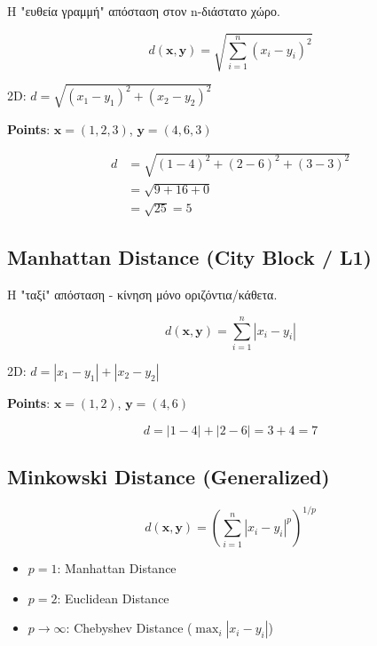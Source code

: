 Η "ευθεία γραμμή" απόσταση στον n-διάστατο χώρο.

\begin{formulabox}
\begin{equation}
d(\mathbf{x}, \mathbf{y}) = \sqrt{\sum_{i=1}^{n} (x_i - y_i)^2}
\end{equation}

2D: $d = \sqrt{(x_1 - y_1)^2 + (x_2 - y_2)^2}$
\end{formulabox}

\begin{examplebox}
\textbf{Points}: $\mathbf{x} = (1, 2, 3)$, $\mathbf{y} = (4, 6, 3)$

\begin{align*}
d &= \sqrt{(1-4)^2 + (2-6)^2 + (3-3)^2} \\
  &= \sqrt{9 + 16 + 0} \\
  &= \sqrt{25} = \boxed{5}
\end{align*}
\end{examplebox}

\subsection{Manhattan Distance (City Block / L1)}

Η "ταξί" απόσταση - κίνηση μόνο οριζόντια/κάθετα.

\begin{formulabox}
\begin{equation}
d(\mathbf{x}, \mathbf{y}) = \sum_{i=1}^{n} |x_i - y_i|
\end{equation}

2D: $d = |x_1 - y_1| + |x_2 - y_2|$
\end{formulabox}

\begin{examplebox}
\textbf{Points}: $\mathbf{x} = (1, 2)$, $\mathbf{y} = (4, 6)$

\[
d = |1-4| + |2-6| = 3 + 4 = \boxed{7}
\]
\end{examplebox}

\subsection{Minkowski Distance (Generalized)}

\begin{formulabox}
\begin{equation}
d(\mathbf{x}, \mathbf{y}) = \left(\sum_{i=1}^{n} |x_i - y_i|^p\right)^{1/p}
\end{equation}

\begin{itemize}
    \item $p = 1$: Manhattan Distance
    \item $p = 2$: Euclidean Distance
    \item $p \to \infty$: Chebyshev Distance ($\max_i |x_i - y_i|$)
\end{itemize}
\end{formulabox}

